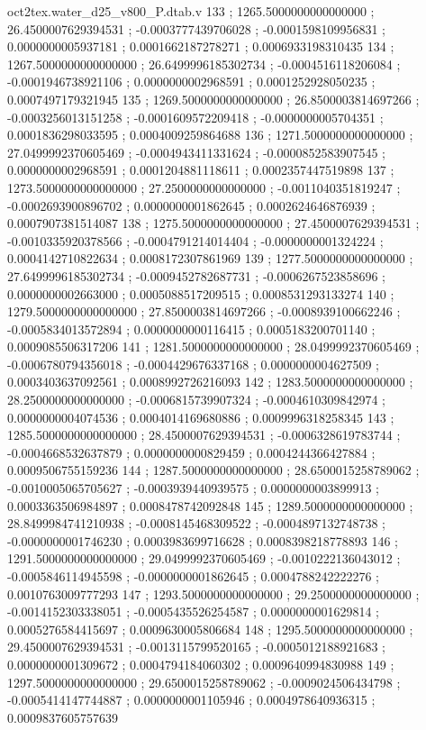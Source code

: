 \begin{filecontents}[overwrite]{oct2tex.water_d25_v800_P.dtab.v}
133 ; 1265.5000000000000000 ; 26.4500007629394531 ; -0.0003777439706028 ; -0.0001598109956831 ; 0.0000000005937181 ; 0.0001662187278271 ; 0.0006933198310435
134 ; 1267.5000000000000000 ; 26.6499996185302734 ; -0.0004516118206084 ; -0.0001946738921106 ; 0.0000000002968591 ; 0.0001252928050235 ; 0.0007497179321945
135 ; 1269.5000000000000000 ; 26.8500003814697266 ; -0.0003256013151258 ; -0.0001609572209418 ; -0.0000000005704351 ; 0.0001836298033595 ; 0.0004009259864688
136 ; 1271.5000000000000000 ; 27.0499992370605469 ; -0.0004943411331624 ; -0.0000852583907545 ; 0.0000000002968591 ; 0.0001204881118611 ; 0.0002357447519898
137 ; 1273.5000000000000000 ; 27.2500000000000000 ; -0.0011040351819247 ; -0.0002693900896702 ; 0.0000000001862645 ; 0.0002624646876939 ; 0.0007907381514087
138 ; 1275.5000000000000000 ; 27.4500007629394531 ; -0.0010335920378566 ; -0.0004791214014404 ; -0.0000000001324224 ; 0.0004142710822634 ; 0.0008172307861969
139 ; 1277.5000000000000000 ; 27.6499996185302734 ; -0.0009452782687731 ; -0.0006267523858696 ; 0.0000000002663000 ; 0.0005088517209515 ; 0.0008531293133274
140 ; 1279.5000000000000000 ; 27.8500003814697266 ; -0.0008939100662246 ; -0.0005834013572894 ; 0.0000000000116415 ; 0.0005183200701140 ; 0.0009085506317206
141 ; 1281.5000000000000000 ; 28.0499992370605469 ; -0.0006780794356018 ; -0.0004429676337168 ; 0.0000000004627509 ; 0.0003403637092561 ; 0.0008992726216093
142 ; 1283.5000000000000000 ; 28.2500000000000000 ; -0.0006815739907324 ; -0.0004610309842974 ; 0.0000000004074536 ; 0.0004014169680886 ; 0.0009996318258345
143 ; 1285.5000000000000000 ; 28.4500007629394531 ; -0.0006328619783744 ; -0.0004668532637879 ; 0.0000000000829459 ; 0.0004244366427884 ; 0.0009506755159236
144 ; 1287.5000000000000000 ; 28.6500015258789062 ; -0.0010005065705627 ; -0.0003939440939575 ; 0.0000000003899913 ; 0.0003363506984897 ; 0.0008478742092848
145 ; 1289.5000000000000000 ; 28.8499984741210938 ; -0.0008145468309522 ; -0.0004897132748738 ; -0.0000000001746230 ; 0.0003983699716628 ; 0.0008398218778893
146 ; 1291.5000000000000000 ; 29.0499992370605469 ; -0.0010222136043012 ; -0.0005846114945598 ; -0.0000000001862645 ; 0.0004788242222276 ; 0.0010763009777293
147 ; 1293.5000000000000000 ; 29.2500000000000000 ; -0.0014152303338051 ; -0.0005435526254587 ; 0.0000000001629814 ; 0.0005276584415697 ; 0.0009630005806684
148 ; 1295.5000000000000000 ; 29.4500007629394531 ; -0.0013115799520165 ; -0.0005012188921683 ; 0.0000000001309672 ; 0.0004794184060302 ; 0.0009640994830988
149 ; 1297.5000000000000000 ; 29.6500015258789062 ; -0.0009024506434798 ; -0.0005414147744887 ; 0.0000000001105946 ; 0.0004978640936315 ; 0.0009837605757639

\end{filecontents}
